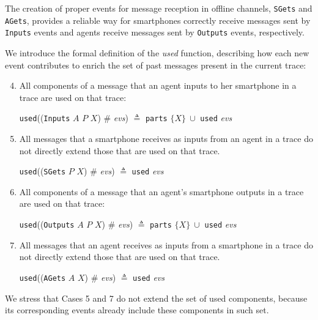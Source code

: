 The creation of proper events for message reception in offline channels, \texttt{SGets} and \texttt{AGets}, provides a reliable way for smartphones correctly receive messages sent by \texttt{Inputs} events and agents receive messages sent by \texttt{Outputs} events, respectively.

We introduce the formal definition of the \textit{used} function, describing how each new event contributes to enrich the set of past messages present in the current trace:

\begin{enumerate}
  \setcounter{enumi}{3}
  \item All components of a message that an agent inputs to her smartphone in a trace are used on that trace:
  \begin{center}
    \texttt{used}((\texttt{Inputs} $A$ $P$ $X$) $\#$ \textit{evs}) $\triangleq$ \texttt{parts} $\{ X\}\ \cup$ \texttt{used} \textit{evs}
  \end{center}

  \item All messages that a smartphone receives as inputs from an agent in a trace do not directly extend those that are used on that trace.
  \begin{center}
    \texttt{used}((\texttt{SGets} $P$ $X$) $\#$ \textit{evs}) $\triangleq$ \texttt{used} \textit{evs}
  \end{center}

  \item All components of a message that an agent's smartphone outputs in a trace are used on that trace:
  \begin{center}
    \texttt{used}((\texttt{Outputs} $A$ $P$ $X$) $\#$ \textit{evs}) $\triangleq$ \texttt{parts} $\{ X\}\ \cup$ \texttt{used} \textit{evs}
  \end{center}

  \item All messages that an agent receives as inputs from a smartphone in a trace do not directly extend those that are used on that trace.
  \begin{center}
    \texttt{used}((\texttt{AGets} $A$ $X$) $\#$ \textit{evs}) $\triangleq$ \texttt{used} \textit{evs}
  \end{center}
\end{enumerate}

\noindent We stress that Cases 5 and 7 do not extend the set of used components, because its corresponding events already include these components in such set.



